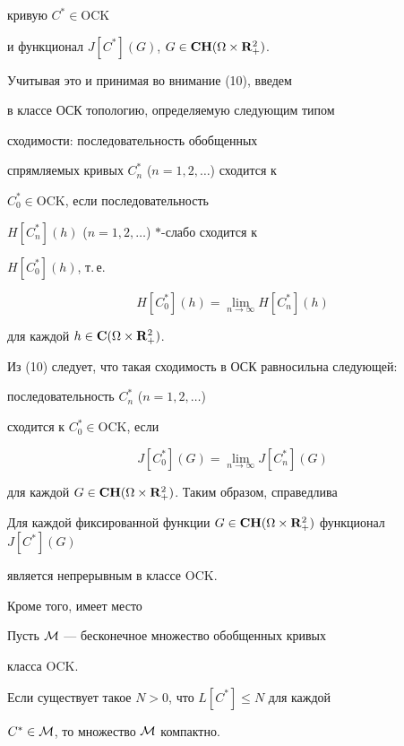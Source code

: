кривую $C^*\in \mathrm{OCK}$


и функционал $J[C^*](G)$, $G\in {\bold{CH}}(\Omega \times {\bold R}^2_+)$.


Учитывая это и принимая во внимание (10), введем


в классе ОСК топологию, определяемую следующим типом


сходимости: последовательность обобщенных


спрямляемых кривых $C^*_n$ ($n=1,2,\dotsc$) сходится к


$C^*_0\in \mathrm{OCK}$, если последовательность


$H[C^*_n](h)$ ($n=1,2,\dotsc$) $*$-слабо сходится к


$H[C^*_0](h)$, т.\,е.


$$


H[C^*_0](h)=\lim_{n\to \infty }H[C^*_n](h)


$$


для каждой $h\in {\bold{C}}(\Omega \times {\bold R}^2_+)$.


Из (10) следует, что такая сходимость в ОСК равносильна следующей:


последовательность $C^*_n$ ($n=1,2,\dotsc$)


сходится к $C^*_0\in\mathrm{OCK}$, если


$$


J[C^*_0](G)=\lim_{n\to\infty}J[C^*_n](G)


$$


для каждой $G\in


{\bold{CH}}(\Omega\times{\bold R}^2_+)$. Таким образом, справедлива





\begin{thm}


Для каждой фиксированной функции $G\in {\bold{CH}}(\Omega


\times {\bold R}^2_+)$ функционал $J[C^*](G)$


является непрерывным в классе $\mathrm{OCK}$.


\end{thm}





Кроме того, имеет место





\begin{thm}


Пусть ${\cal M} $ --- бесконечное множество обобщенных кривых


класса $\mathrm{OCK}$.


Если существует такое $N > 0$, что $L[C^*] \leq N$ для каждой


$C^*\in {\cal M} $, то множество $ {\cal M} $ компактно.


\end{thm}





